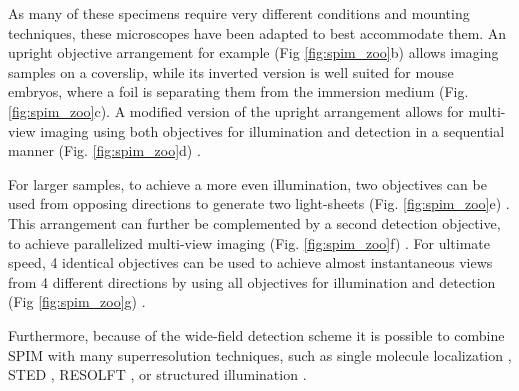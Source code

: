   As many of these specimens require very different conditions and mounting techniques, these microscopes have been adapted to best accommodate them. An upright objective arrangement for example (Fig \ref{fig:spim_zoo}b) allows imaging samples on a coverslip, while its inverted version is well suited for mouse embryos, where a foil is separating them from the immersion medium (Fig. \ref{fig:spim_zoo}c). A modified version of the upright arrangement allows for multi-view imaging using both objectives for illumination and detection in a sequential manner (Fig. \ref{fig:spim_zoo}d) \cite{kumar_dual-view_2014}.

  For larger samples, to achieve a more even illumination, two objectives can be used from opposing directions to generate two light-sheets (Fig. \ref{fig:spim_zoo}e) \cite{huisken_even_2007}. This arrangement can further be complemented by a second detection objective, to achieve parallelized multi-view imaging (Fig. \ref{fig:spim_zoo}f) \cite{krzic_multiview_2012,tomer_quantitative_2012, schmid_high-speed_2013}. For ultimate speed, 4 identical objectives can be used to achieve almost instantaneous views from 4 different directions by using all objectives for illumination and detection (Fig \ref{fig:spim_zoo}g) \cite{chhetri_whole-animal_2015}. 

  Furthermore, because of the wide-field detection scheme it is possible to combine SPIM with many superresolution techniques, such as single molecule localization \cite{cella_zanacchi_live-cell_2011}, STED \cite{friedrich_sted-spim:_2011}, RESOLFT \cite{hoyer_breaking_2016}, or structured illumination \cite{keller_fast_2010,chen_lattice_2014,chang_csilsfm_2017}.


  
  




